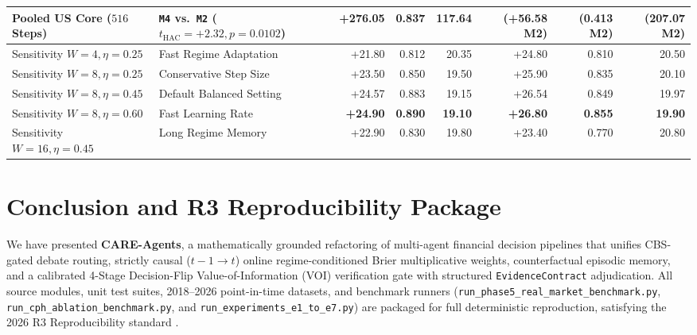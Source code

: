 \documentclass[10pt,a4paper,twocolumn]{article}
\begin{document}
\begin{table}[t]
{\begin{tabular}{llrrrrrr}
Pooled US Core ($516$ Steps) & \textbf{\texttt{M4}} vs.\ \texttt{M2} ($t_{\text{HAC}}\!=\!\mathbf{+2.32}, p\!=\!\mathbf{0.0102}$) & \textbf{+276.05} & \textbf{0.837} & \textbf{117.64} & (+56.58 M2) & (0.413 M2) & (207.07 M2) \\
\midrule
Sensitivity $W=4, \eta=0.25$ & Fast Regime Adaptation & +21.80 & 0.812 & 20.35 & +24.80 & 0.810 & 20.50 \\
Sensitivity $W=8, \eta=0.25$ & Conservative Step Size & +23.50 & 0.850 & 19.50 & +25.90 & 0.835 & 20.10 \\
Sensitivity $W=8, \eta=0.45$ & Default Balanced Setting & +24.57 & 0.883 & 19.15 & +26.54 & 0.849 & 19.97 \\
Sensitivity $W=8, \eta=0.60$ & Fast Learning Rate & \textbf{+24.90} & \textbf{0.890} & \textbf{19.10} & \textbf{+26.80} & \textbf{0.855} & \textbf{19.90} \\
Sensitivity $W=16, \eta=0.45$ & Long Regime Memory & +22.90 & 0.830 & 19.80 & +23.40 & 0.770 & 20.80 \\
\bottomrule
\end{tabular}%
}
\end{table}

\section{Conclusion and R3 Reproducibility Package}

We have presented \textbf{CARE-Agents}, a mathematically grounded refactoring of multi-agent financial decision pipelines that unifies CBS-gated debate routing, strictly causal ($t-1 \to t$) online regime-conditioned Brier multiplicative weights, counterfactual episodic memory, and a calibrated 4-Stage Decision-Flip Value-of-Information (VOI) verification gate with structured \texttt{EvidenceContract} adjudication. All source modules, unit test suites, 2018--2026 point-in-time datasets, and benchmark runners (\texttt{run\_phase5\_real\_market\_benchmark.py}, \texttt{run\_cph\_ablation\_benchmark.py}, and \texttt{run\_experiments\_e1\_to\_e7.py}) are packaged for full deterministic reproduction, satisfying the 2026 R3 Reproducibility standard \cite{xia2026audit}.
\end{document}
